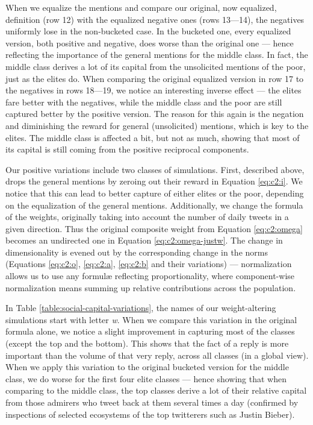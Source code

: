 \documentclass[10pt,oneside]{memoir}
\begin{document}
\begin{Spacing}{2}
When we equalize the mentions and compare our original, now equalized, definition (row 12) with the equalized negative ones (rows 13---14), the negatives uniformly lose in the non-bucketed case.  In the bucketed one, every equalized version, both positive and negative, does worse than the original one --- hence reflecting the importance of the general mentions for the middle class.  In fact, the middle class derives a lot of its capital from the unsolicited mentions of the poor, just as the elites do.  When comparing the original equalized version in row 17 to the negatives in rows 18---19, we notice an interesting inverse effect --- the elites fare better with the negatives, while the middle class and the poor are still captured better by the positive version.  The reason for this again is the negation and diminishing the reward for general (unsolicited) mentions, which is key to the elites.  The middle class is affected a bit, but not as much, showing that most of its capital is still coming from the positive reciprocal components.


Our positive variations include two classes of simulations.  First, described above, drops the general mentions by zeroing out their reward in Equation \ref{eq:c2:i}.  We notice that this can lead to better capture of either elites or the poor, depending on the equalization of the general mentions.  Additionally, we change the formula of the weights, originally taking into account the number of daily tweets in a given direction.  Thus the original composite weight from Equation \ref{eq:c2:omega} becomes an undirected one in Equation \ref{eq:c2:omega-justw}.  The change in dimensionality is evened out by the corresponding change in the norms (Equations \ref{eq:c2:o}, \ref{eq:c2:a}, \ref{eq:c2:b} and their variations) --- normalization allows us to use any formulæ reflecting proportionality, where component-wise normalization means summing up relative contributions across the population.


In Table \ref{table:social-capital-variations}, the names of our weight-altering simulations start with letter \emph{w}.  When we compare this variation in the original formula alone, we notice a slight improvement in capturing most of the classes (except the top and the bottom).  This shows that the fact of a reply is more important than the volume of that very reply, across all classes (in a global view).  When we apply this variation to the original bucketed version for the middle class, we do worse for the first four elite classes --- hence showing that when comparing to the middle class, the top classes derive a lot of their relative capital from those admirers who tweet back at them several times a day (confirmed by inspections of selected ecosystems of the top twitterers such as Justin Bieber).  



\end{Spacing}
\end{document}
